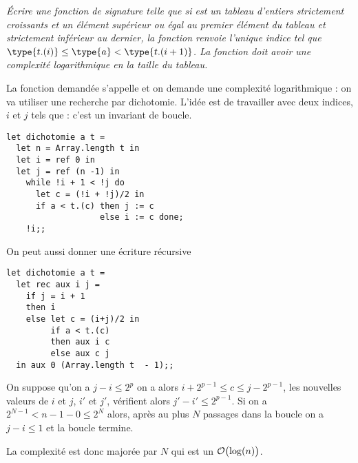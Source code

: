 \begin{Exercise}\it
Écrire une fonction  de signature  telle que si  est un tableau d’entiers strictement
croissants et  un élément supérieur ou égal au premier élément du
tableau et strictement inférieur au dernier, la fonction renvoie
l’unique indice  tel que $\type{t.(i)} \leq \type{a} < \type{t.(i+1)}$.
La fonction doit avoir une complexité logarithmique en la
taille du tableau.
\end{Exercise}
\begin{Answer}
La fonction demandée s'appelle  et on demande une complexité logarithmique : on va utiliser une recherche par dichotomie. L'idée est de travailler avec deux indices, $i$ et $j$ tels que  : c'est un invariant de boucle.
\begin{lstlisting}
let dichotomie a t =
  let n = Array.length t in
  let i = ref 0 in
  let j = ref (n -1) in
    while !i + 1 < !j do
      let c = (!i + !j)/2 in
      if a < t.(c) then j := c
                   else i := c done;
    !i;;
\end{lstlisting}

On peut aussi donner une écriture récursive
\begin{lstlisting}
let dichotomie a t =
  let rec aux i j =
    if j = i + 1
    then i
    else let c = (i+j)/2 in
         if a < t.(c)
         then aux i c
         else aux c j
  in aux 0 (Array.length t  - 1);;
\end{lstlisting}

On suppose qu'on a $j-i \le 2^p$ on a alors $i+2^{p-1} \le c \le j-2^{p-1}$, les nouvelles valeurs de $i$ et $j$, $i'$ et $j'$, vérifient alors $j'-i' \le 2^{p-1}$. Si on a $2^{N-1} < n-1-0\le 2^N$ alors, après au plus $N$ passages dans la boucle on a $j-i\le 1$ et la boucle termine.

La complexité est donc majorée par $N$ qui est un ${\cal O}\bigl(\log(n)\bigr)$.
\end{Answer}

\medskip


